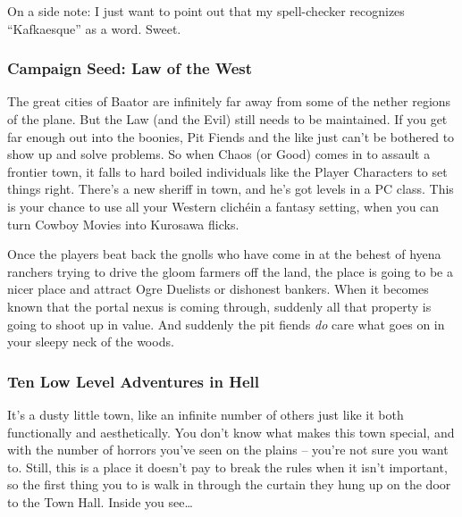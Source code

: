 On a side note: I just want to point out that my spell-checker recognizes ``Kafkaesque'' as a word. Sweet.

\subsubsection{Campaign Seed: Law of the West}

The great cities of Baator are infinitely far away from some of the nether regions of the plane. But the Law (and the Evil) still needs to be maintained. If you get far enough out into the boonies, Pit Fiends and the like just can't be bothered to show up and solve problems. So when Chaos (or Good) comes in to assault a frontier town, it falls to hard boiled individuals like the Player Characters to set things right. There's a new sheriff in town, and he's got levels in a PC class. This is your chance to use all your Western clichéin a fantasy setting, when you can turn Cowboy Movies into Kurosawa flicks.

Once the players beat back the gnolls who have come in at the behest of hyena ranchers trying to drive the gloom farmers off the land, the place is going to be a nicer place and attract Ogre Duelists or dishonest bankers. When it becomes known that the portal nexus is coming through, suddenly all that property is going to shoot up in value. And suddenly the pit fiends \textit{do} care what goes on in your sleepy neck of the woods.

\subsubsection{Ten Low Level Adventures in Hell}

It's a dusty little town, like an infinite number of others just like it both functionally and aesthetically. You don't know what makes this town special, and with the number of horrors you've seen on the plains -- you're not sure you want to. Still, this is a place it doesn't pay to break the rules when it isn't important, so the first thing you to is walk in through the curtain they hung up on the door to the Town Hall. Inside you see\ldots

